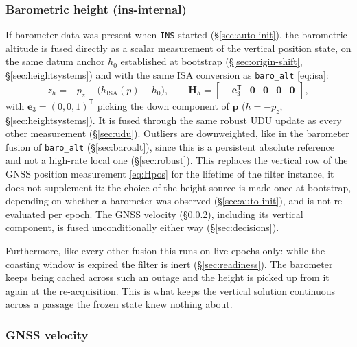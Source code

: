\documentclass[11pt,a4paper]{article}
\newcommand{\vect}[1]{\bm{#1}}
\newcommand{\mat}[1]{\bm{#1}}
\newcommand{\T}{^{\mathsf{T}}}
\newcommand{\code}[1]{\texttt{#1}}
\begin{document}
\subsubsection{Barometric height (ins-internal)}
\label{sec:baro-height-meas}

If barometer data was present when \code{INS} started
(\S\ref{sec:auto-init}), the barometric altitude is fused directly as a
scalar measurement of the vertical position state, on the same datum
anchor $h_0$ established at bootstrap (\S\ref{sec:origin-shift},
\S\ref{sec:heightsystems}) and with the same ISA conversion as
\code{baro\_\allowbreak{}alt} \eqref{eq:isa}:
\begin{equation}
  z_h = -p_z - \big(h_{\text{ISA}}(p) - h_0\big),
  \qquad
  \mat{H}_h = \begin{bmatrix}
    -\vect{e}_3\T & \mat{0} & \mat{0} & \mat{0} & \mat{0}
  \end{bmatrix},
  \label{eq:Hbaroheight}
\end{equation}
with $\vect{e}_3 = (0,0,1)\T$ picking the down component of $\vect{p}$
($h = -p_z$, \S\ref{sec:heightsystems}). It is fused through the same
robust UDU update as every other measurement (\S\ref{sec:udu}). Outliers are
downweighted, like in the barometer fusion of \code{baro\_\allowbreak{}alt}
(\S\ref{sec:baroalt}), since this is a persistent absolute reference and not a
high-rate local one (\S\ref{sec:robust}). This replaces the vertical row of the
GNSS position measurement
\eqref{eq:Hpos} for the lifetime of the filter instance, it does not
supplement it: the choice of the
height source is made once at bootstrap, depending on whether a barometer was
observed (\S\ref{sec:auto-init}), and is not re-evaluated per epoch. The GNSS
velocity (\S\ref{sec:gnss-vel}), including its vertical component, is
fused unconditionally either way (\S\ref{sec:decisions}).

Furthermore, like every other fusion this runs on live epochs only: while the
coasting window is expired the filter is inert
(\S\ref{sec:readiness}). The barometer keeps being cached across such
an outage and the height is picked up from it again at the
re-acquisition. This is what keeps the vertical solution continuous
across a passage the frozen state knew nothing about.

\subsubsection{GNSS velocity}
\label{sec:gnss-vel}
\end{document}
